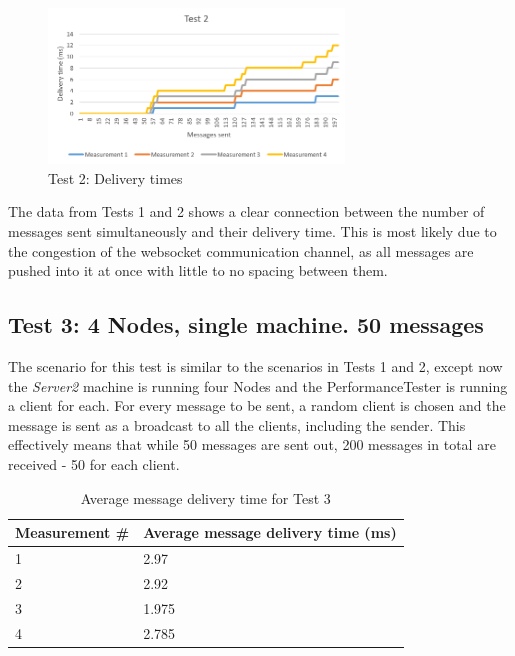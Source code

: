 \begin{figure}[!ht]
	\centering
	\includegraphics[width=0.7\textwidth]{figures/05_testing/test-perf2}
    \caption{Test 2: Delivery times}
    \label{fig:test-perf2}
\end{figure}

\clearpage

The data from Tests 1 and 2 shows a clear connection between the number of messages sent simultaneously and their delivery time. This is most likely due to the congestion of the websocket communication channel, as all messages are pushed into it at once with little to no spacing between them.

\subsection{Test 3: 4 Nodes, single machine. 50 messages}
The scenario for this test is similar to the scenarios in Tests 1 and 2, except now the \textit{Server2} machine is running four Nodes and the PerformanceTester is running a client for each. For every message to be sent, a random client is chosen and the message is sent as a broadcast to all the clients, including the sender. This effectively means that while 50 messages are sent out, 200 messages in total are received - 50 for each client.

\begin{table}[!ht]
\begin{center}
\begin{tabularx}{0.7\textwidth}{l|l}
\hline
\textbf{Measurement \#} & \textbf{Average message delivery time (ms)} \\
\hline
1 & 2.97\\
\hline
2 & 2.92\\
\hline
3 & 1.975\\
\hline
4 & 2.785\\
\hline
\end{tabularx}
\end{center}
\caption{Average message delivery time for Test 3}
\label{tab:test-perf3}
\end{table}

